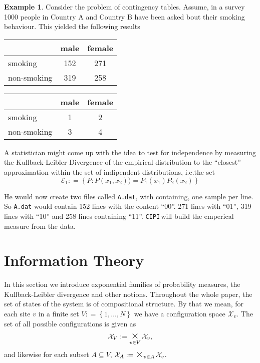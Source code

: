 \documentclass[12pt]{amsart}
\newcommand{\set}[1]{\left\lbrace #1 \right\rbrace} %
\newcommand{\defas}{\mathrel{\mathop{:}}=}   %
\renewcommand{\subset}{\subseteq}  %
\DeclareMathOperator*{\bigtimes}{\textnormal{\Large $\times$}} %
\newcommand{\ie}{i.e.\;}  %
\newcommand{\cipi}{\texttt{CIPI}\,}
\theoremstyle{plain}%
\theoremstyle{definition}
\newtheorem{exmp}[thm]{Example}
\theoremstyle{remark}
\begin{document}
\begin{exmp}
  Consider the problem of contingency tables. Assume, in a survey 1000 people in
  Country A and Country B have been asked bout their smoking behaviour. This
  yielded the following results
  \begin{center}
  \begin{tabular}[]{|l|c|c|}
    \hline
    & male & female \\
    \hline
    smoking & 152 & 271 \\
    non-smoking & 319 & 258\\
    \hline
  \end{tabular}\hspace{1cm}
  \begin{tabular}[]{|l|c|c|}
    \hline
    & male & female \\
    \hline
    smoking & 1 & 2 \\
    non-smoking & 3 & 4\\
    \hline
  \end{tabular}
\end{center}

  A statistician might come up with the idea to test for independence by
  measuring the Kullback-Leibler Divergence of the empirical distribution to the
  ``closest'' approximation within the set of indipendent distributions, \ie the
  set 
  \begin{equation*}
    \mathcal{E}_1 \defas \set{P : P\left( x_1,x_2 \right)) = P_1(x_1)P_2(x_2)}
  \end{equation*}

  He would now create two files called \texttt{A.dat},  with
  containing, one sample per line. So \texttt{A.dat} would contain 152 lines
  with the content ``00''. 271 lines with ``01'', 319 lines with ``10'' and 258
  lines containing ``11''. \cipi will build the emperical measure from the data.
  
\end{exmp}

\section{Information Theory}
\label{sec:theory}
In this section we introduce exponential families of probability
measures, the Kullback-Leibler divergence and other notions.
Throughout the whole paper, the set of states of the system is of compositional
structure. By that we mean, for each site $v$ in a finite set $V \defas
\set{1,\ldots, N}$ we have a configuration space $\mathcal{X}_v$. The set of all
possible configurations is given as 
\begin{equation*}
\mathcal{X}_V \defas \bigtimes_{v\in V}\mathcal{X}_v,
\end{equation*}and likewise for each subset $A\subset V$, $\mathcal{X}_A \defas
\bigtimes_{v\in A}\mathcal{X}_v$.
\end{document}
